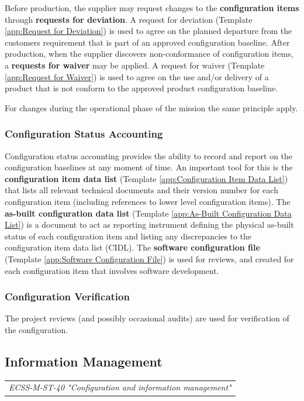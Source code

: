 Before production, the supplier may request changes to the \textbf{configuration items} through \textbf{requests for deviation}. A request for deviation (Template \ref{app:Request for Deviation}) is used to agree on the planned departure from the customers requirement that is part of an approved configuration baseline. After production, when the supplier discovers non-conformance of configuration items, a \textbf{requests for waiver} may be applied.  A request for waiver (Template \ref{app:Request for Waiver}) is used to agree on the use and/or delivery of a product that is not conform to the approved product configuration baseline.

For changes during the operational phase of the mission the same principle apply.

\subsubsection{Configuration Status Accounting}

Configuration status accounting provides the ability to record and report on the configuration baselines at any moment of time. An important tool for this is the \textbf{configuration item data list} (Template \ref{app:Configuration Item Data List}) that lists all relevant technical documents and their version number for each configuration item (including references to lower level configuration items). The \textbf{as-built configuration data list} (Template \ref{app:As-Built Configuration Data List}) is a document to act as reporting instrument defining the physical as-built status of each configuration item and listing any discrepancies to the configuration item data list (CIDL). The \textbf{software configuration file} (Template \ref{app:Software Configuration File}) is used for reviews, and created for each configuration item that involves software development.

\subsubsection{Configuration Verification}

The project reviews (and possibly occasional audits) are used for verification of the configuration.

\subsection{Information Management}

\begin{tabular}{l}
\textit{ECSS-M-ST-40 "Configuration and information management" \cite{ECSS-M-ST-40}}
\end{tabular}


